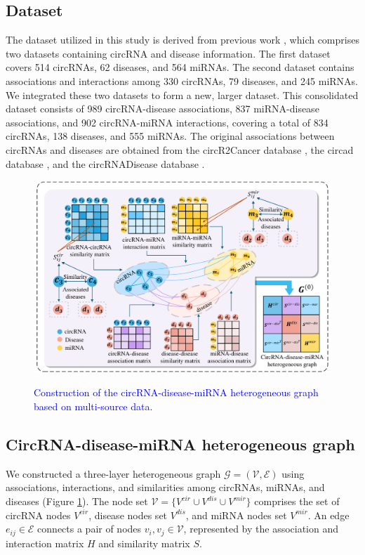 \documentclass{bioinfo}
\begin{document}
\begin{methods}
\subsection{Dataset}
The dataset utilized in this study is derived from previous work \cite{lan2022kgancda}, which comprises two datasets containing circRNA and disease information. The first dataset covers 514 circRNAs, 62 diseases, and 564 miRNAs. The second dataset contains associations and interactions among 330 circRNAs, 79 diseases, and 245 miRNAs. We integrated these two datasets to form a new, larger dataset. This consolidated dataset consists of 989 circRNA-disease associations, 837 miRNA-disease associations, and 902 circRNA-miRNA interactions, covering a total of 834 circRNAs, 138 diseases, and 555 miRNAs. The original associations between circRNAs and diseases are obtained from the circR2Cancer database \cite{lan2020circr2cancer}, the circad database \cite{rophina2020circad}, and the circRNADisease database \cite{zhao2018circrna}.

\begin{figure}[t]
	\centering
	\includegraphics[width=7in]{fig/visio2.pdf}\\
	\vspace{0.2cm}
	\caption{\textcolor{blue}{Construction of the circRNA-disease-miRNA heterogeneous graph based on multi-source data.}}
	\label{fig:visio2}
	\vspace{0.1cm}
\end{figure}


\subsection{CircRNA-disease-miRNA heterogeneous graph}
We constructed a three-layer heterogeneous graph $\mathcal{G}=(\mathcal{V}, \mathcal{E})$ using associations, interactions, and similarities among circRNAs, miRNAs, and diseases (Figure \ref{fig:visio2}). The node set $\mathcal{V}=\{V^{cir}\cup V^{dis}\cup V^{mir}\}$ comprises the set of circRNA nodes $V^{cir}$, disease nodes set $V^{dis}$, and miRNA nodes set $V^{mir}$. An edge $e_{ij} \in \mathcal{E}$ connects a pair of nodes $v_i,v_j \in \mathcal{V}$, represented by the association and interaction matrix $H$ and similarity matrix $S$.


\end{methods}
\end{document}

